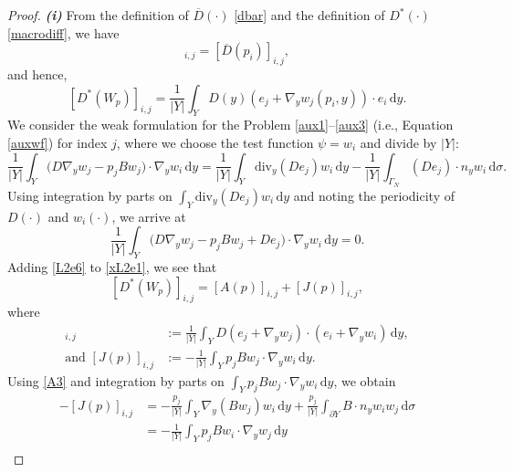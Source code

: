 \documentclass[11pt]{article}
\newcommand{\di}[1]{\,\mathrm{d}#1}
\begin{document}
\begin{proof}

    \par \textbf{\textit{(i)}} From the definition of $\overline{D}(\cdot)$ \eqref{dbar} and the definition of $D^*(\cdot)$ \eqref{macrodiff}, we have
    \begin{equation}
       [ D^*(W_p)]_{i,j}=[\overline{D}(p_i)]_{i,j},\label{Q}
    \end{equation}
    and hence,
\begin{equation}\label{xL2e1}
    [D^*(W_p)]_{i,j}=\frac{1}{|Y|}\int_Y D(y)\left(e_j+\nabla_y w_j(p_i,y)\right)\cdot e_i \di{y}.
\end{equation}
We consider the weak formulation for the Problem \eqref{aux1}--\eqref{aux3} (i.e., Equation \eqref{auxwf}) for index $j$, where we choose the test function $\psi=w_i$ and divide by $|Y|$:
%
\begin{equation}\label{L2e5}
    \frac{1}{|Y|}\int_{Y}\big(D\nabla_y w_j- p_jBw_j\big)\cdot \nabla_y w_i\di{y}
    =\frac{1}{|Y|}\int_Y\text{div}_y(D e_j)w_i\di{y}-\frac{1}{|Y|}\int_{\Gamma_N}\left( De_j\right)\cdot n_y w_i\di{\sigma}.
\end{equation}
Using integration by parts on $\int_Y\text{div}_y(D e_j)w_i\di{y}$ and noting the periodicity of $D(\cdot)$ and $w_i(\cdot)$, we arrive at
\begin{equation}\label{L2e6}
    \frac{1}{|Y|}\int_{Y}\big( D\nabla_y w_j- p_jBw_j+D e_j\big)\cdot \nabla_yw_i \di{y} =0.
\end{equation}
Adding \eqref{L2e6} to \eqref{xL2e1}, we see that
\begin{equation}\label{L2e7}
    [D^*(W_p)]_{i,j}=[A(p)]_{i,j}+[J(p)]_{i,j},
\end{equation}
where 
\begin{align}
    [A(p)]_{i,j}&:=\frac{1}{|Y|}\int_Y D(e_j+\nabla_yw_j)\cdot 
    (e_i+\nabla_y w_i)\di{y},\label{L2e8}\\
   \text{and } [J(p)]_{i,j}&:=-\frac{1}{|Y|}\int_{Y}p_jBw_j\cdot \nabla_y w_i\di{y}.\label{L2e9}
\end{align}
Using \ref{A3} and integration by parts on $\int_{Y}p_jBw_j\cdot \nabla_y w_i\di{y}$, we obtain
\begin{align}
    -[J(p)]_{i,j}&=-\frac{p_j}{|Y|}\int_{Y}\nabla_y(Bw_j)  w_i\di{y}+\frac{p_j}{|Y|}\int_{\partial Y}B\cdot n_y w_iw_j\di{\sigma}\nonumber\\
    &=-\frac{1}{|Y|}\int_{Y}p_jBw_i\cdot \nabla_y w_j\di{y}\nonumber\\

\end{align}
\end{proof}
\end{document}
